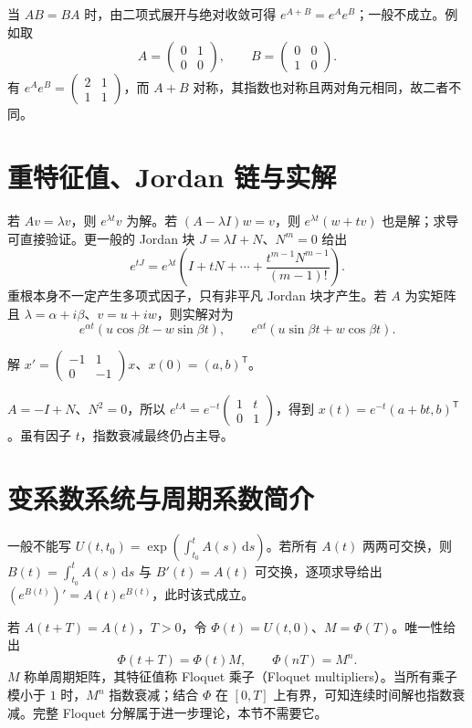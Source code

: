 当 $AB=BA$ 时，由二项式展开与绝对收敛可得 $e^{A+B}=e^Ae^B$；一般不成立。例如取
\[
 A=\begin{pmatrix}0&1\\0&0\end{pmatrix},\qquad B=\begin{pmatrix}0&0\\1&0\end{pmatrix}.
\]
有 $e^Ae^B=\begin{pmatrix}2&1\\1&1\end{pmatrix}$，而 $A+B$ 对称，其指数也对称且两对角元相同，故二者不同。

\section{重特征值、Jordan 链与实解}
若 $Av=\lambda v$，则 $e^{\lambda t}v$ 为解。若 $(A-\lambda I)w=v$，则 $e^{\lambda t}(w+tv)$ 也是解；求导可直接验证。更一般的 Jordan 块 $J=\lambda I+N$、$N^m=0$ 给出
\[
 e^{tJ}=e^{\lambda t}\left(I+tN+\cdots+\frac{t^{m-1}N^{m-1}}{(m-1)!}\right).
\]
重根本身不一定产生多项式因子，只有非平凡 Jordan 块才产生。若 $A$ 为实矩阵且 $\lambda=\alpha+i\beta$、$v=u+iw$，则实解对为
\[
 e^{\alpha t}(u\cos\beta t-w\sin\beta t),\qquad
 e^{\alpha t}(u\sin\beta t+w\cos\beta t).
\]

\begin{example}
解 $x'=\begin{pmatrix}-1&1\\0&-1\end{pmatrix}x$、$x(0)=(a,b)^{\mathsf T}$。
\end{example}
\begin{solve}
$A=-I+N$、$N^2=0$，所以 $e^{tA}=e^{-t}\begin{pmatrix}1&t\\0&1\end{pmatrix}$，得到 $x(t)=e^{-t}(a+bt,b)^{\mathsf T}$。虽有因子 $t$，指数衰减最终仍占主导。
\end{solve}

\section{变系数系统与周期系数简介}
一般不能写 $U(t,t_0)=\exp(\int_{t_0}^t A(s)\,\mathrm ds)$。若所有 $A(t)$ 两两可交换，则 $B(t)=\int_{t_0}^t A(s)\,\mathrm ds$ 与 $B'(t)=A(t)$ 可交换，逐项求导给出 $(e^{B(t)})'=A(t)e^{B(t)}$，此时该式成立。

若 $A(t+T)=A(t)$，$T>0$，令 $\Phi(t)=U(t,0)$、$M=\Phi(T)$。唯一性给出
\[
 \Phi(t+T)=\Phi(t)M,\qquad \Phi(nT)=M^n.
\]
$M$ 称单周期矩阵，其特征值称 Floquet 乘子（Floquet multipliers）。当所有乘子模小于 $1$ 时，$M^n$ 指数衰减；结合 $\Phi$ 在 $[0,T]$ 上有界，可知连续时间解也指数衰减。完整 Floquet 分解属于进一步理论，本节不需要它。

